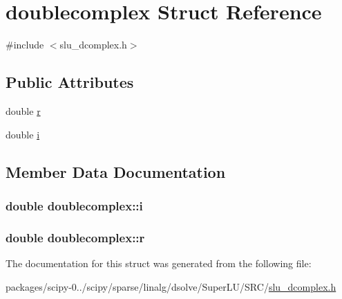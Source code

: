 \hypertarget{structdoublecomplex}{}\section{doublecomplex Struct Reference}
\label{structdoublecomplex}


{\ttfamily \#include $<$slu\+\_\+dcomplex.\+h$>$}

\subsection*{Public Attributes}
\begin{DoxyCompactItemize}
\item 
double \hyperlink{structdoublecomplex_a7b1a3f489cadc006bfe2fda973267af6}{r}
\item 
double \hyperlink{structdoublecomplex_a336ddbef83d1878426558d417a6ecfbb}{i}
\end{DoxyCompactItemize}


\subsection{Member Data Documentation}
\hypertarget{structdoublecomplex_a336ddbef83d1878426558d417a6ecfbb}{}
\subsubsection[{i}]{\setlength{\rightskip}{0pt plus 5cm}double doublecomplex\+::i}\label{structdoublecomplex_a336ddbef83d1878426558d417a6ecfbb}
\hypertarget{structdoublecomplex_a7b1a3f489cadc006bfe2fda973267af6}{}
\subsubsection[{r}]{\setlength{\rightskip}{0pt plus 5cm}double doublecomplex\+::r}\label{structdoublecomplex_a7b1a3f489cadc006bfe2fda973267af6}


The documentation for this struct was generated from the following file\+:\begin{DoxyCompactItemize}
\item 
packages/scipy-\/0../scipy/sparse/linalg/dsolve/\+Super\+L\+U/\+S\+R\+C/\hyperlink{slu__dcomplex_8h}{slu\+\_\+dcomplex.\+h}\end{DoxyCompactItemize}
